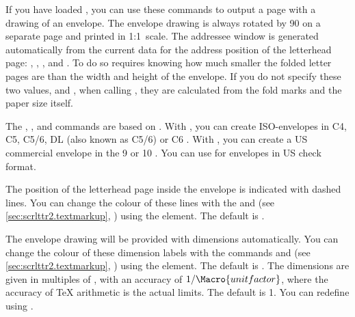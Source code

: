 \begin{Declaration}
\end{Declaration}
If you have loaded , you can use these commands to output
a page with a drawing of an envelope. The envelope drawing is always rotated
by 90\textdegree{} on a separate page and printed in 1:1~scale. The addressee
window is generated automatically from the current data for the address
position of the letterhead page: , ,
, and . To do so requires knowing how
much smaller the folded letter pages are than the width and height of the
envelope. If you do not specify these two values,  and
, when calling , they are calculated from
the fold marks and the paper size itself.

The , , and 
commands are based on . With , you
can create ISO-envelopes in C4, C5, C5/6, DL (also known as C5/6) or C6
. With , you can create a US commercial
envelope in the 9 or 10 . You can use  for
envelopes in US check format.

%
The position of the letterhead page inside the envelope is indicated with
dashed lines. You can change the colour of these lines with the
 and 
(see \autoref{sec:scrlttr2.textmarkup},
) using the
 element. The default is
.%
%

%
The envelope drawing will be provided with dimensions automatically. You can
change the colour of these dimension labels with the commands
 and 
(see \autoref{sec:scrlttr2.textmarkup},
) using the
 element. The default is
. The dimensions are given in multiples of
, with an accuracy of $1/\Macro{unitfactor}$, where the
accuracy of \TeX{} arithmetic is the actual limits. The default is 1. You can
redefine  using .%
%

